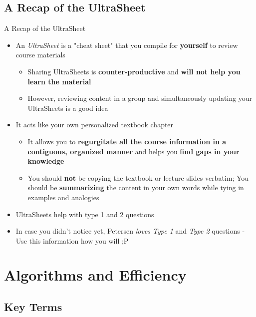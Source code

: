 \documentclass[hyperref={colorlinks,citecolor=blue,linkcolor=blue,urlcolor=blue}, aspectratio=1610]{beamer}
\begin{document}
\subsection{A Recap of the UltraSheet\texttrademark{}}
\begin{frame}{A Recap of the UltraSheet\texttrademark{}}
  \begin{itemize}
    \item An \textit{UltraSheet\texttrademark{}} is a "cheat sheet" that you compile for \textbf{yourself} to review course materials 
    \begin{itemize}
      \item Sharing UltraSheets\texttrademark{} is \textbf{counter-productive} and \textbf{will not help you learn the material}
      \item However, reviewing content in a group and simultaneously updating your UltraSheets\texttrademark{} is a good idea
    \end{itemize}
    \item It acts like your own personalized textbook chapter
    \begin{itemize}
      \item It allows you to \textbf{regurgitate all the course information in a contiguous, organized manner} and helps you \textbf{find gaps in your knowledge}
      \item You should \textbf{not} be copying the textbook or lecture slides verbatim; You should be \textbf{summarizing} the content in your own words while tying in examples and analogies
    \end{itemize}
    \item UltraSheets\texttrademark{} help with type 1 and 2 questions 
  \item In case you didn't notice yet, Petersen \textit{loves Type 1} and \textit{Type 2} questions - Use this information how you will ;P
  \end{itemize}

\end{frame}

\section{Algorithms and Efficiency}

\subsection{Key Terms}
\end{document}
